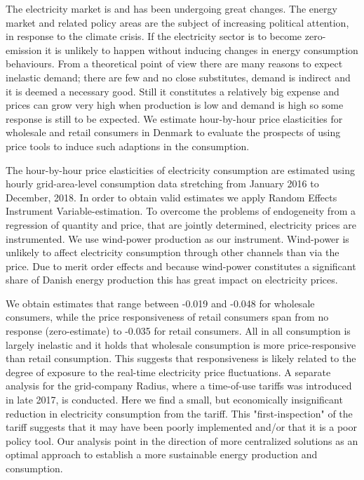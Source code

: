 \label{sec:conclusion}

The electricity market is and has been undergoing great changes. The energy market and related policy areas are the subject of increasing political attention, in response to the climate crisis. If the electricity sector is to become zero-emission it is unlikely to happen without inducing changes in energy consumption behaviours. From a theoretical point of view there are many reasons to expect inelastic demand; there are few and no close substitutes, demand is indirect and it is deemed a necessary good. Still it constitutes a relatively big expense and prices can grow very high when production is low and demand is high so some response is still to be expected. We estimate hour-by-hour price elasticities for wholesale and retail consumers in Denmark to evaluate the prospects of using price tools to induce such adaptions in the consumption. \bigskip \par
The hour-by-hour price elasticities of electricity consumption are estimated using hourly grid-area-level consumption data stretching from January 2016 to December, 2018. In order to obtain valid estimates we apply Random Effects Instrument Variable-estimation. To overcome the problems of endogeneity from a regression of quantity and price, that are jointly determined, electricity prices are instrumented. We use wind-power production as our instrument. Wind-power is unlikely to affect electricity consumption through other channels than via the price. Due to merit order effects and because wind-power constitutes a significant share of Danish energy production this has great impact on electricity prices. \bigskip \par
We obtain estimates that range between -0.019 and -0.048 for wholesale consumers, while the price responsiveness of retail consumers span from no response (zero-estimate) to -0.035 for retail consumers.  All in all consumption is largely inelastic and it holds that wholesale consumption is more price-responsive than retail consumption. This suggests that responsiveness is likely related to the degree of exposure to the real-time electricity price fluctuations. A separate analysis for the grid-company Radius,  where a time-of-use tariffs was introduced in late 2017, is conducted. Here we find a small, but economically insignificant reduction in electricity consumption from the tariff. This "first-inspection" of the tariff suggests that it may have been poorly implemented and/or that it is a poor policy tool. Our analysis point in the direction of more centralized solutions as an optimal approach to establish a more sustainable energy production and consumption. 
\begin{comment}

Literature in this field is quite large but there is still substantial room for improvement, especially within the field of estimating hour-by-hour responses at the micro-level to capture heterogeneity in this aspect.
\end{comment}